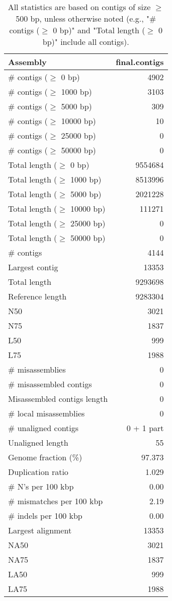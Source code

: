 \documentclass[12pt,a4paper]{article}
\begin{document}
\begin{table}[ht]
\begin{center}
\caption{All statistics are based on contigs of size $\geq$ 500 bp, unless otherwise noted (e.g., "\# contigs ($\geq$ 0 bp)" and "Total length ($\geq$ 0 bp)" include all contigs).}
\begin{tabular}{|l*{1}{|r}|}
\hline
Assembly & final.contigs \\ \hline
\# contigs ($\geq$ 0 bp) & 4902 \\ \hline
\# contigs ($\geq$ 1000 bp) & 3103 \\ \hline
\# contigs ($\geq$ 5000 bp) & 309 \\ \hline
\# contigs ($\geq$ 10000 bp) & 10 \\ \hline
\# contigs ($\geq$ 25000 bp) & 0 \\ \hline
\# contigs ($\geq$ 50000 bp) & 0 \\ \hline
Total length ($\geq$ 0 bp) & 9554684 \\ \hline
Total length ($\geq$ 1000 bp) & 8513996 \\ \hline
Total length ($\geq$ 5000 bp) & 2021228 \\ \hline
Total length ($\geq$ 10000 bp) & 111271 \\ \hline
Total length ($\geq$ 25000 bp) & 0 \\ \hline
Total length ($\geq$ 50000 bp) & 0 \\ \hline
\# contigs & 4144 \\ \hline
Largest contig & 13353 \\ \hline
Total length & 9293698 \\ \hline
Reference length & 9283304 \\ \hline
N50 & 3021 \\ \hline
N75 & 1837 \\ \hline
L50 & 999 \\ \hline
L75 & 1988 \\ \hline
\# misassemblies & 0 \\ \hline
\# misassembled contigs & 0 \\ \hline
Misassembled contigs length & 0 \\ \hline
\# local misassemblies & 0 \\ \hline
\# unaligned contigs & 0 + 1 part \\ \hline
Unaligned length & 55 \\ \hline
Genome fraction (\%) & 97.373 \\ \hline
Duplication ratio & 1.029 \\ \hline
\# N's per 100 kbp & 0.00 \\ \hline
\# mismatches per 100 kbp & 2.19 \\ \hline
\# indels per 100 kbp & 0.00 \\ \hline
Largest alignment & 13353 \\ \hline
NA50 & 3021 \\ \hline
NA75 & 1837 \\ \hline
LA50 & 999 \\ \hline
LA75 & 1988 \\ \hline
\end{tabular}
\end{center}
\end{table}
\end{document}
